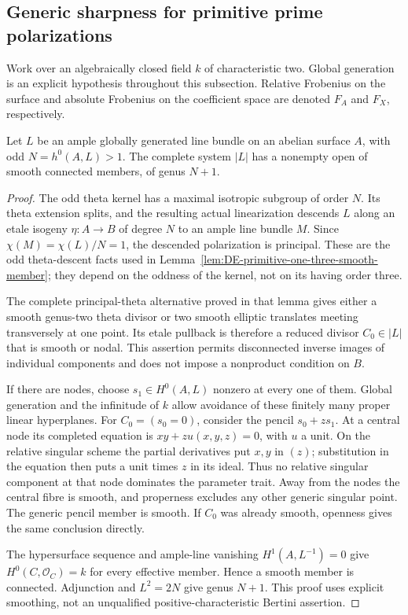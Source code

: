 \subsection{Generic sharpness for primitive prime polarizations}

Work over an algebraically closed field \(k\) of characteristic two.
Global generation is an explicit hypothesis throughout this subsection.
Relative Frobenius on the surface and absolute Frobenius on the
coefficient space are denoted \(F_A\) and \(F_X\), respectively.

\begin{lemma}
\label{lem:primitive-odd-smooth-members}
Let \(L\) be an ample globally generated line bundle on an abelian
surface \(A\), with odd \(N=h^0(A,L)>1\). The complete system
\(|L|\) has a nonempty open of smooth connected members, of genus
\(N+1\).
\end{lemma}
\begin{proof}
The odd theta kernel has a maximal isotropic subgroup of order
\(N\). Its theta extension splits, and the resulting actual
linearization descends \(L\) along an etale isogeny
\(\eta:A\to B\) of degree \(N\) to an ample line bundle \(M\).
Since \(\chi(M)=\chi(L)/N=1\), the descended polarization is
principal. These are the odd theta-descent facts used in
Lemma~\ref{lem:DE-primitive-one-three-smooth-member}; they depend
on the oddness of the kernel, not on its having order three.

The complete principal-theta alternative proved in that lemma
gives either a smooth genus-two theta divisor or two smooth
elliptic translates meeting transversely at one point. Its etale
pullback is therefore a reduced divisor \(C_0\in|L|\) that is
smooth or nodal. This assertion permits disconnected inverse
images of individual components and does not impose a nonproduct
condition on \(B\).

If there are nodes, choose \(s_1\in H^0(A,L)\) nonzero at every
one of them. Global generation and the infinitude of \(k\) allow
avoidance of these finitely many proper linear hyperplanes.
For \(C_0=(s_0=0)\), consider the pencil \(s_0+z s_1\).
At a central node its completed equation is
\(xy+z u(x,y,z)=0\), with \(u\) a unit. On the relative
singular scheme the partial derivatives put \(x,y\) in \((z)\);
substitution in the equation then puts a unit times \(z\) in
its ideal. Thus no relative singular component at that node
dominates the parameter trait. Away from the nodes the central
fibre is smooth, and properness excludes any other generic
singular point. The generic pencil member is smooth. If \(C_0\)
was already smooth, openness gives the same conclusion directly.

The hypersurface sequence and ample-line vanishing
\(H^1(A,L^{-1})=0\) give \(H^0(C,\mathcal O_C)=k\) for
every effective member. Hence a smooth member is connected.
Adjunction and \(L^2=2N\) give genus \(N+1\).
This proof uses explicit smoothing, not an unqualified
positive-characteristic Bertini assertion.
\end{proof}

